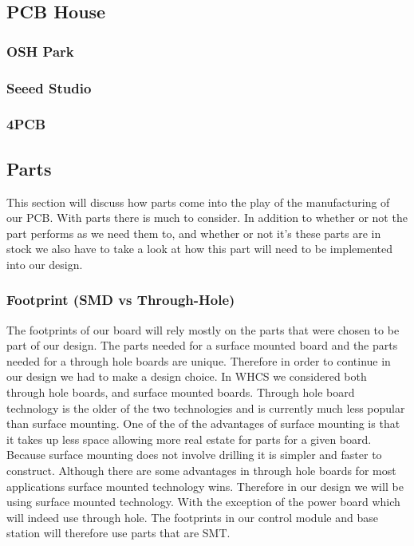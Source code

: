 \subsection{PCB House}

\subsubsection{OSH Park}

\subsubsection{Seeed Studio}

\subsubsection{4PCB}

\subsection{Parts}
This section will discuss how parts come into the play of the manufacturing of
our PCB. With parts there is much to consider. In addition to whether or not
the part performs as we need them to, and whether or not it{}'s these parts are
in stock we also have to take a look at how this part will need to be
implemented into our design.

\subsubsection{Footprint (SMD vs Through-Hole)}
The footprints of our board will rely mostly on the parts that were chosen to
be part of our design. The parts needed for a surface mounted board and the
parts needed for a through hole boards are unique. Therefore in order to
continue in our design we had to make a design choice. In WHCS we considered
both through hole boards, and surface mounted boards. Through hole board
technology is the older of the two technologies and is currently much less
popular than surface mounting. One of the of the advantages of surface mounting
is that it takes up less space allowing more real estate for parts for a given
board. Because surface mounting does not involve drilling it is simpler and
faster to construct. Although there are some advantages in through hole boards
for most applications surface mounted technology wins. Therefore in our design
we will be using surface mounted technology. With the exception of the power
board which will indeed use through hole. The footprints in our control module
and base station will therefore use parts that are SMT.

